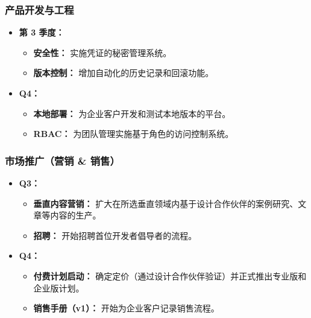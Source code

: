 \documentclass[11pt, a4paper, oneside]{article}
\begin{document}
\subsubsection*{产品开发与工程}
\begin{itemize}[leftmargin=*]
    \item \textbf{第 3 季度：}
    \begin{itemize}
        \item \textbf{安全性：} 实施凭证的秘密管理系统。



\item \textbf{版本控制：} 增加自动化的历史记录和回滚功能。
\end{itemize}
\item \textbf{Q4：}
\begin{itemize}
    \item \textbf{本地部署：} 为企业客户开发和测试本地版本的平台。
    \item \textbf{RBAC：} 为团队管理实施基于角色的访问控制系统。
\end{itemize}
\end{itemize}

\subsubsection*{市场推广（营销 \& 销售）}
\begin{itemize}[leftmargin=*]
    \item \textbf{Q3：}
    \begin{itemize}
        \item \textbf{垂直内容营销：} 扩大在所选垂直领域内基于设计合作伙伴的案例研究、文章等内容的生产。
        \item \textbf{招聘：} 开始招聘首位开发者倡导者的流程。
    \end{itemize}
    \item \textbf{Q4：}
    \begin{itemize}
        \item \textbf{付费计划启动：} 确定定价（通过设计合作伙伴验证）并正式推出专业版和企业版计划。
        \item \textbf{销售手册（v1）：} 开始为企业客户记录销售流程。
    \end{itemize}
\end{itemize}

\clearpage
\end{document}
